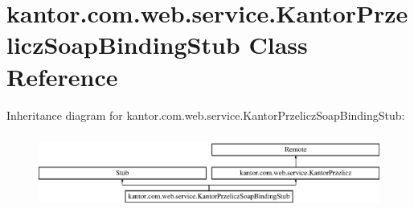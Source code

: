 \hypertarget{classkantor_1_1com_1_1web_1_1service_1_1_kantor_przelicz_soap_binding_stub}{\section{kantor.\+com.\+web.\+service.\+Kantor\+Przelicz\+Soap\+Binding\+Stub Class Reference}
\label{classkantor_1_1com_1_1web_1_1service_1_1_kantor_przelicz_soap_binding_stub}
}
Inheritance diagram for kantor.\+com.\+web.\+service.\+Kantor\+Przelicz\+Soap\+Binding\+Stub\+:\begin{figure}[H]
\begin{center}
\leavevmode
\includegraphics[height=2.492581cm]{classkantor_1_1com_1_1web_1_1service_1_1_kantor_przelicz_soap_binding_stub}
\end{center}
\end{figure}
